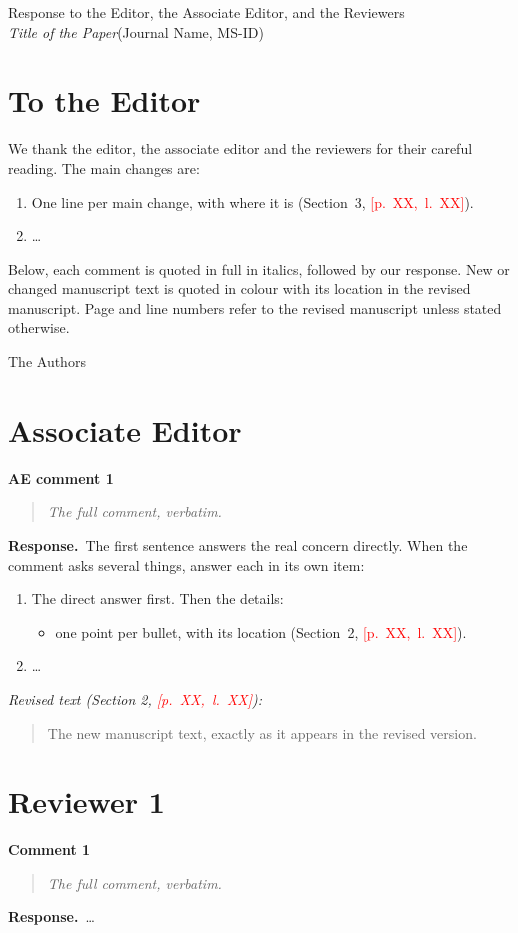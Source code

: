 \documentclass[11pt]{article}
\newcommand{\PH}{\mbox{\textcolor{red}{[p.~XX, l.~XX]}}\xspace}
\newcommand{\journal}{Journal Name}
\newcommand{\msid}{MS-ID}
\newcommand{\papertitle}{Title of the Paper}
\newenvironment{revcomment}[1]
  {\par\needspace{6\baselineskip}\medskip\noindent\textbf{#1}\par\nopagebreak
   \begin{quote}\itshape\small}
  {\end{quote}}
\newcommand{\response}{\par\needspace{3\baselineskip}\noindent\textbf{Response.}\ }
\newenvironment{revised}[1]
  {\par\smallskip\noindent\textit{Revised text (#1):}\par\nopagebreak
   \begin{quote}\small\color{newtext}}
  {\end{quote}}
\begin{document}
\begin{center}
  {\Large Response to the Editor, the Associate Editor, and the Reviewers}\\[4pt]
  \textit{\papertitle}\quad (\journal, \msid)
\end{center}

\section*{To the Editor}

We thank the editor, the associate editor and the reviewers for their careful reading. The main
changes are:
\begin{enumerate}
  \item One line per main change, with where it is (Section~3, \PH).
  \item \dots
\end{enumerate}
Below, each comment is quoted in full in italics, followed by our response. New or changed
manuscript text is quoted in colour with its location in the revised manuscript. Page and line
numbers refer to the revised manuscript unless stated otherwise.

\hfill The Authors

\section*{Associate Editor}

\begin{revcomment}{AE comment 1}
The full comment, verbatim.
\end{revcomment}
\response The first sentence answers the real concern directly. When the comment asks several
things, answer each in its own item:
\begin{enumerate}
  \item The direct answer first. Then the details:
  \begin{itemize}
    \item one point per bullet, with its location (Section~2, \PH).
  \end{itemize}
  \item \dots
\end{enumerate}

\begin{revised}{Section 2, \PH}
The new manuscript text, exactly as it appears in the revised version.
\end{revised}

\section*{Reviewer 1}

\begin{revcomment}{Comment 1}
The full comment, verbatim.
\end{revcomment}
\response \dots
\end{document}
